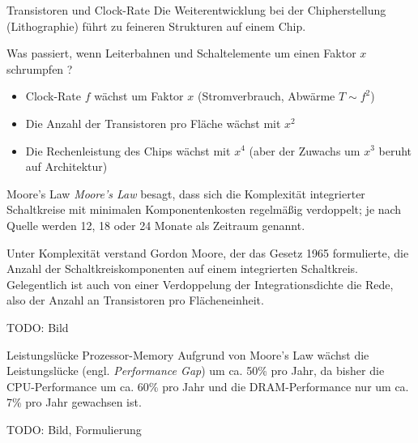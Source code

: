 \begin{bonus}{Transistoren und Clock-Rate}
    Die Weiterentwicklung bei der Chipherstellung (Lithographie) führt zu feineren Strukturen auf einem Chip.

    Was passiert, wenn Leiterbahnen und Schaltelemente um einen Faktor $x$ schrumpfen ?
    \begin{itemize}
        \item Clock-Rate $f$ wächst um Faktor $x$ (Stromverbrauch, Abwärme $T \sim f^2$)
        \item Die Anzahl der Transistoren pro Fläche wächst mit $x^2$
        \item Die Rechenleistung des Chips wächst mit $x^4$ (aber der Zuwachs um $x^3$ beruht auf Architektur)
    \end{itemize}
\end{bonus}

\begin{defi}{Moore's Law}
    \emph{Moore's Law} besagt, dass sich die Komplexität integrierter Schaltkreise mit minimalen Komponentenkosten regelmäßig verdoppelt; je nach Quelle werden 12, 18 oder 24 Monate als Zeitraum genannt.

    Unter Komplexität verstand Gordon Moore, der das Gesetz 1965 formulierte, die Anzahl der Schaltkreiskomponenten auf einem integrierten Schaltkreis. Gelegentlich ist auch von einer Verdoppelung der Integrationsdichte die Rede, also der Anzahl an Transistoren pro Flächeneinheit.

    TODO: Bild
\end{defi}

\begin{bonus}{Leistungslücke Prozessor-Memory}
    Aufgrund von Moore's Law wächst die Leistungslücke (engl. \emph{Performance Gap}) um ca. 50\% pro Jahr, da bisher die CPU-Performance um ca. 60\% pro Jahr und die DRAM-Performance nur um ca. 7\% pro Jahr gewachsen ist.

    TODO: Bild, Formulierung
\end{bonus}
